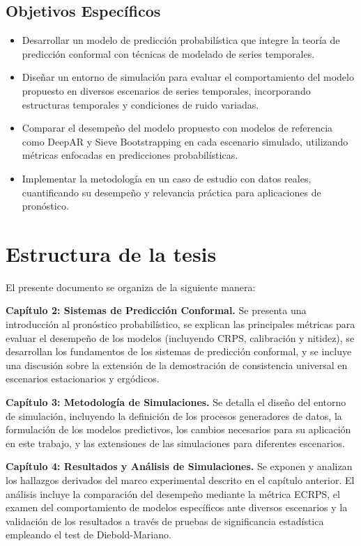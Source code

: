 \subsection{Objetivos Específicos}

\begin{itemize}
    \item Desarrollar un modelo de predicción probabilística que integre la teoría de predicción conformal con técnicas de modelado de series temporales.
    
    \item Diseñar un entorno de simulación para evaluar el comportamiento del modelo propuesto en diversos escenarios de series temporales, incorporando estructuras temporales y condiciones de ruido variadas.
    
    \item Comparar el desempeño del modelo propuesto con modelos de referencia como DeepAR y Sieve Bootstrapping en cada escenario simulado, utilizando métricas enfocadas en predicciones probabilísticas.
    
    \item Implementar la metodología en un caso de estudio con datos reales, cuantificando su desempeño y relevancia práctica para aplicaciones de pronóstico.
\end{itemize}

\section{Estructura de la tesis}

El presente documento se organiza de la siguiente manera:

\textbf{Capítulo 2: Sistemas de Predicción Conformal.} Se presenta una introducción al pronóstico probabilístico, se explican las principales métricas para evaluar el desempeño de los modelos (incluyendo CRPS, calibración y nitidez), se desarrollan los fundamentos de los sistemas de predicción conformal, y se incluye una discusión sobre la extensión de la demostración de consistencia universal en escenarios estacionarios y ergódicos.

\textbf{Capítulo 3: Metodología de Simulaciones.} Se detalla el diseño del entorno de simulación, incluyendo la definición de los procesos generadores de datos, la formulación de los modelos predictivos, los cambios necesarios para su aplicación en este trabajo, y las extensiones de las simulaciones para diferentes escenarios.

\textbf{Capítulo 4: Resultados y Análisis de Simulaciones.} Se exponen y analizan los hallazgos derivados del marco experimental descrito en el capítulo anterior. El análisis incluye la comparación del desempeño mediante la métrica ECRPS, el examen del comportamiento de modelos específicos ante diversos escenarios y la validación de los resultados a través de pruebas de significancia estadística empleando el test de Diebold-Mariano.

